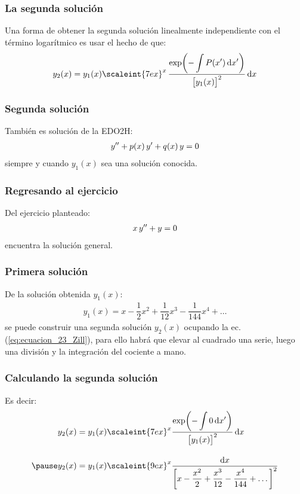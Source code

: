 \documentclass[12pt]{beamer}
\begin{document}
\begin{frame}
\frametitle{La segunda solución}
Una forma de obtener la segunda solución linealmente independiente con el término logarítmico es usar el hecho de que:
\pause
\begin{align}
y_{2} (x) = y_{1}(x) \scaleint{7ex}^{x} \, \dfrac{\exp(\displaystyle -\int P(x') \dd{x'})}{\big[ y_{1}(x) \big]^{2}} \dd{x}
\label{eq:ecuacion_23_Zill}
\end{align}
\end{frame}
\begin{frame}
\frametitle{Segunda solución}
También es solución de la EDO2H:
\begin{align*}
{y}^{\prime \prime} + p(x) \, {y}^{\prime} + q(x) \, y = 0
\end{align*}
siempre y cuando $y_{1}(x)$ sea una solución conocida.
\end{frame}
\begin{frame}
\frametitle{Regresando al ejercicio}
Del ejercicio planteado:
\begin{align*}
x \, {y}^{\prime \prime} + y = 0
\end{align*}
encuentra la solución general.
\end{frame}
\begin{frame}
\frametitle{Primera solución}
De la solución obtenida $y_{1}(x)$:
\pause
\begin{align*}
y_{1}(x) = x - \dfrac{1}{2} x^{2} + \dfrac{1}{12} x^{3} - \dfrac{1}{144} x^{4}  + \ldots
\end{align*}
\pause
se puede construir una segunda solución $y_{2}(x)$ ocupando la ec. (\ref{eq:ecuacion_23_Zill}), para ello habrá que elevar al cuadrado una serie, luego una división y la integración del cociente a mano.
\end{frame}
\begin{frame}
\frametitle{Calculando la segunda solución}
Es decir:
\pause
\begin{eqnarray*}
\begin{aligned}
y_{2}(x) &= y_{1}(x) \scaleint{7ex}^{x} \dfrac{\exp(\displaystyle -\int 0 \dd{x'})}{\big[ y_{1}(x) \big]^{2}} \dd{x} \\[1em] \pause
y_{2} (x) &= y_{1} (x) \scaleint{9ex}^{x} \dfrac{\dd{x}}{\bigg[ x - \dfrac{x^{2}}{2} + \dfrac{x^{3}}{12} - \dfrac{x^{4}}{144} + \ldots \bigg]^{2}} 
\end{aligned}
\end{eqnarray*}
\end{frame}
\end{document}
